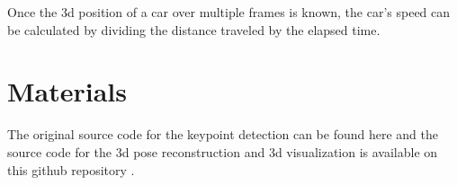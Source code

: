 \documentclass[conference]{IEEEtran}
\begin{document}
Once the 3d position of a car over multiple frames is known, the car's speed can be calculated by dividing the distance traveled by the elapsed time. 

\section{Materials}

The original source code for the keypoint detection can be found here \cite{keypoints} and the source code for the 3d pose reconstruction and 3d visualization is available on this github repository \cite{keypoint2pose}.



\end{document}
